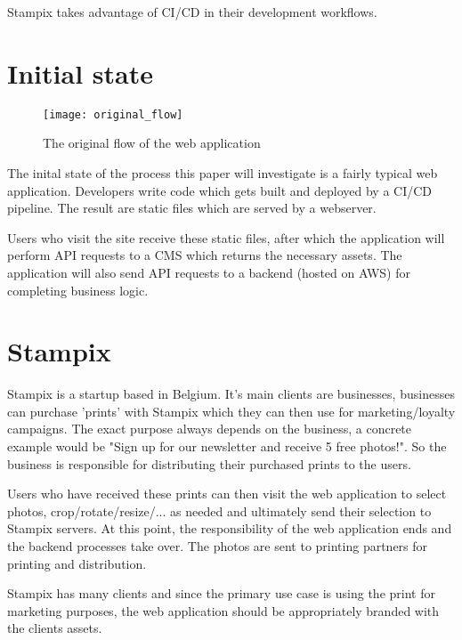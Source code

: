 Stampix takes advantage of CI/CD in their development workflows.

\section{Initial state}

\begin{figure}[h!]
	\texttt{[image: original\_flow]}
	\caption{The original flow of the web application}
	\label{fig:original_flow}
\end{figure}


The inital state of the process this paper will investigate is a fairly typical web application. Developers write code which gets built and deployed by a CI/CD pipeline. The result are static files which are served by a webserver.

Users who visit the site receive these static files, after which the application will perform API requests to a CMS which returns the necessary assets. The application will also send API requests to a backend (hosted on AWS) for completing business logic.


\section{Stampix}

Stampix is a startup based in Belgium. It's main clients are businesses, businesses can purchase 'prints' with Stampix which they can then use for marketing/loyalty campaigns. 
The exact purpose always depends on the business, a concrete example would be "Sign up for our newsletter and receive 5 free photos!". So the business is responsible for distributing their purchased prints to the users.

Users who have received these prints can then visit the web application to select photos, crop/rotate/resize/... as needed and ultimately send their selection to Stampix servers. 
At this point, the responsibility of the web application ends and the backend processes take over. The photos are sent to printing partners for printing and distribution.

Stampix has many clients and since the primary use case is using the print for marketing purposes, the web application should be appropriately branded with the clients assets.

